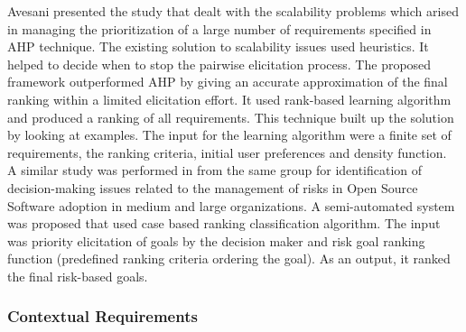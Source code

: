 	Avesani \etal\cite{PAvesani} presented the study that dealt with the scalability problems which arised in managing the prioritization of a large number of requirements
specified in AHP technique. The existing solution to scalability issues used
heuristics. It helped to decide when to stop the pairwise elicitation process.
The proposed framework outperformed AHP by giving an accurate approximation of
the final ranking within a limited elicitation effort. It used rank-based
learning algorithm and produced a ranking of all requirements. This technique
built up the solution by looking at examples. The input for the learning
algorithm were a finite set of requirements, the ranking criteria, initial user
preferences and density function.\\

	A similar study was performed in \cite{7320432} from the same group
\cite{PAvesani} for identification of decision-making issues related to the
management of risks in Open Source Software adoption in medium and large
organizations. A semi-automated system was proposed that used case based
ranking classification algorithm. The input was priority elicitation of goals by
the decision maker and risk goal ranking function (predefined ranking criteria
ordering the goal). As an output, it ranked the final risk-based goals.\\



\subsubsection{Contextual Requirements} 

